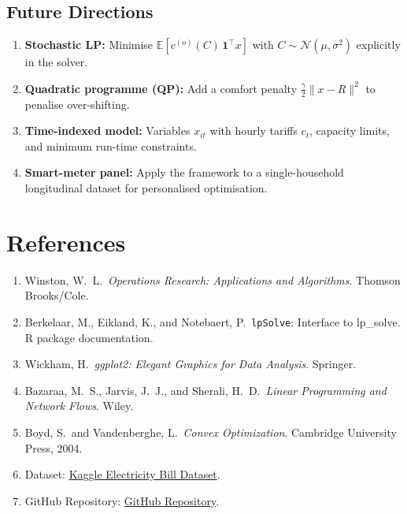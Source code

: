 \documentclass[12pt,a4paper]{article}
\begin{document}
\subsection{Future Directions}

\begin{enumerate}
  \item \textbf{Stochastic LP:} Minimise
        $\mathbb{E}\!\left[c^{(o)}(C)\,\mathbf{1}^\top x\right]$ with
        $C \sim \mathcal{N}(\mu, \sigma^2)$ explicitly in the solver.
  \item \textbf{Quadratic programme (QP):} Add a comfort penalty
        $\tfrac{\gamma}{2}\|x - R\|^2$ to penalise over-shifting.
  \item \textbf{Time-indexed model:} Variables $x_{it}$ with hourly tariffs $c_t$,
        capacity limits, and minimum run-time constraints.
  \item \textbf{Smart-meter panel:} Apply the framework to a single-household
        longitudinal dataset for personalised optimisation.
\end{enumerate}

\section*{References}

\begin{enumerate}
  \item Winston, W.\ L.\ \textit{Operations Research: Applications and Algorithms}.
        Thomson Brooks/Cole.
  \item Berkelaar, M., Eikland, K., and Notebaert, P.\ \texttt{lpSolve}: Interface to
        lp\_solve. R package documentation.
  \item Wickham, H.\ \textit{ggplot2: Elegant Graphics for Data Analysis}. Springer.
  \item Bazaraa, M.\ S., Jarvis, J.\ J., and Sherali, H.\ D.\ \textit{Linear
        Programming and Network Flows}. Wiley.
  \item Boyd, S.\ and Vandenberghe, L.\ \textit{Convex Optimization}.
        Cambridge University Press, 2004.
  \item Dataset: \href{https://www.kaggle.com/datasets/suraj520/indian-household-electricity-bill}{Kaggle Electricity Bill Dataset}.
  \item GitHub Repository: \href{https://github.com/anii0021/Electricity_bill_minimization}{GitHub Repository}.
\end{enumerate}
\end{document}
